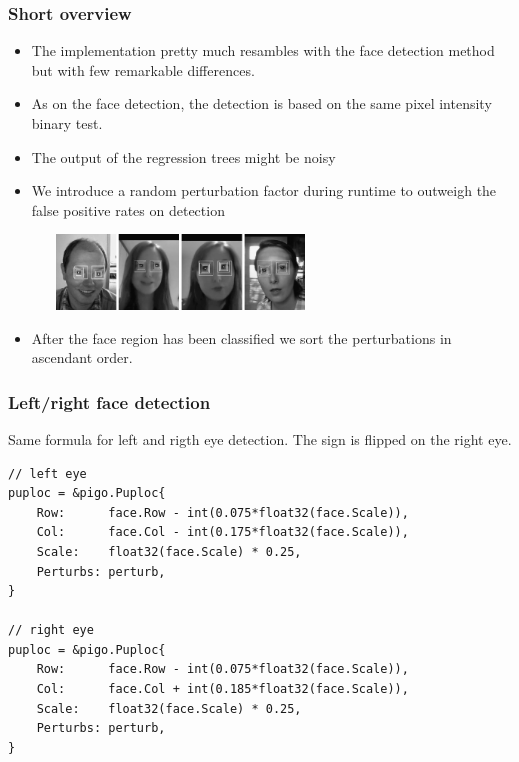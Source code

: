 \documentclass[9pt]{beamer}
\begin{document}
\begin{frame}[fragile]
\frametitle{Short overview}


\begin{itemize}
\item The implementation pretty much resambles with the face detection method but with few remarkable differences.
\end{itemize}

\begin{itemize}
\item As on the face detection, the detection is based on the same pixel intensity binary test.
\item The output of the regression trees might be noisy
\item We introduce a random perturbation factor during runtime to outweigh the false positive rates on detection
\end{itemize}

\begin{figure}[h]
\begin{center}
\includegraphics[width=7cm,height=2cm]{assets/puploc_perturbation.jpg}
\end{center}

\end{figure}

\begin{itemize}
\item After the face region has been classified we sort the perturbations in ascendant order.
\end{itemize}


\end{frame}

\begin{frame}[fragile]
\frametitle{Left/right face detection}


Same formula for left and rigth eye detection. The sign is flipped on the right eye.



\begin{verbatim}
// left eye
puploc = &pigo.Puploc{
    Row:      face.Row - int(0.075*float32(face.Scale)),
    Col:      face.Col - int(0.175*float32(face.Scale)),
    Scale:    float32(face.Scale) * 0.25,
    Perturbs: perturb,
}

// right eye
puploc = &pigo.Puploc{
    Row:      face.Row - int(0.075*float32(face.Scale)),
    Col:      face.Col + int(0.185*float32(face.Scale)),
    Scale:    float32(face.Scale) * 0.25,
    Perturbs: perturb,
}

\end{verbatim}



\end{frame}
\end{document}
